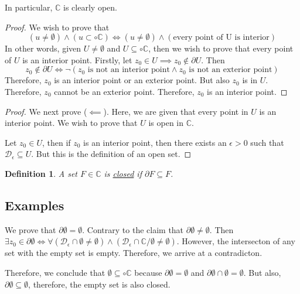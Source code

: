 \documentclass{article}
\newtheorem{definition}[theorem]{Definition}
\newtheorem{one minute paper}[theorem]{One Minute Paper}
\begin{document}
In particular, $\mathbb{C}$ is clearly open. 

\begin{proof}
    We wish to prove that 
    \begin{equation}
        (u \neq \emptyset) \land (u \subset \circ \mathbb{C}) \iff (u \neq \emptyset) \land \left( \text{every point of U is interior} \right)
    \end{equation}
    In other words, given $U \neq \emptyset$ and $U \subseteq \circ \mathbb{C}$, then we wish to prove that every point of $U$ is an interior point. Firstly, let $z_0 \in U \implies z_0 \notin \partial U$. Then 
    \begin{equation}
        z_0 \notin \partial U \iff \lnot \left( \text{$z_0$ is not an interior point} \land \text{$z_0$ is not an exterior point} \right)
    \end{equation}
    Therefore, $z_0$ is an interior point or an exterior point. But also $z_0$ is in $U$. Therefore, $z_0$ cannot be an exterior point. Therefore, $z_0$ is an interior point. 
\end{proof}

\begin{proof}
    We next prove ($\impliedby$). Here, we are given that every point in $U$ is an interior point. We wish to prove that $U$ is open in $\mathbb{C}$. 

    Let $z_0 \in U$, then if $z_0$ is an interior point, then there exists an $\epsilon > 0$ such that $\mathcal{D}_{\epsilon} \subseteq U$. But this is the definition of an open set. 
\end{proof}

\begin{definition}
    A set $F \in \mathbb{C}$ is \underline{closed} if $\partial F \subseteq F$. 
\end{definition}

\subsection*{Examples}

We prove that $\partial \emptyset = \emptyset$. Contrary to the claim that $\partial \emptyset \neq \emptyset$. Then $\exists z_0 \in \partial \emptyset \iff \forall (\mathcal{D}_{\epsilon} \cap \emptyset \neq \emptyset) \land (\mathcal{D}_{\epsilon} \cap \mathbb{C}/\emptyset \neq \emptyset)$. 
However, the intersecton of any set with the empty set is empty. Therefore, we arrive at a contradicton. 

Therefore, we conclude that $\emptyset \subseteq \circ \mathbb{C}$ because $\partial \emptyset = \emptyset$ and $\partial \emptyset \cap \emptyset = \emptyset$. But also, $\partial \emptyset \subseteq \emptyset$, therefore, the empty set is also closed. 
\end{document}
